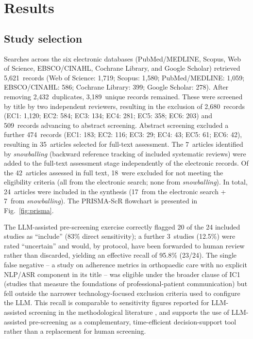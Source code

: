 \documentclass[review,12pt]{elsarticle}
\begin{document}
\section{Results}
\label{sec:resultados}

\subsection{Study selection}

Searches across the six electronic databases (PubMed/MEDLINE, Scopus, Web
of Science, EBSCO/CINAHL, Cochrane Library, and Google Scholar) retrieved
5,621~records (Web of Science: 1,719; Scopus: 1,580; PubMed/MEDLINE: 1,059;
EBSCO/CINAHL: 586; Cochrane Library: 399; Google Scholar: 278). After removing
2,432~duplicates, 3,189~unique records remained. These were screened by
title by two independent reviewers, resulting in the exclusion of
2,680~records (EC1: 1,120; EC2: 584; EC3: 134; EC4: 281; EC5: 358; EC6: 203)
and 509~records advancing to abstract screening. Abstract screening excluded
a further 474~records (EC1: 183; EC2: 116; EC3: 29; EC4: 43; EC5: 61;
EC6: 42), resulting in 35~articles selected for full-text assessment.
The 7~articles identified by \textit{snowballing} (backward reference
tracking of included systematic reviews) were added to the full-text
assessment stage independently of the electronic records. Of the 42~articles
assessed in full text, 18~were excluded for not meeting the eligibility
criteria (all from the electronic search; none from \textit{snowballing}).
In total, 24~articles were included in the synthesis
(17~from the electronic search + 7~from \textit{snowballing}). The
PRISMA-ScR flowchart is presented in Fig.~\ref{fig:prisma}.

The LLM-assisted pre-screening exercise correctly flagged 20 of the 24
included studies as ``include'' (83\% direct sensitivity); a further
3~studies (12.5\%) were rated ``uncertain'' and would, by protocol, have
been forwarded to human review rather than discarded, yielding an effective
recall of 95.8\% (23/24). The single false negative -- a study on
adherence metrics in orthopaedic care with no explicit NLP/ASR component in
its title -- was eligible under the broader clause of IC1 (studies that
measure the foundations of professional-patient communication) but fell
outside the narrower technology-focused exclusion criteria used to
configure the LLM. This recall is comparable to sensitivity figures
reported for LLM-assisted screening in the methodological literature
\citep{Issaiy2024}, and supports the use of LLM-assisted pre-screening as a
complementary, time-efficient decision-support tool rather than a
replacement for human screening.
\end{document}
